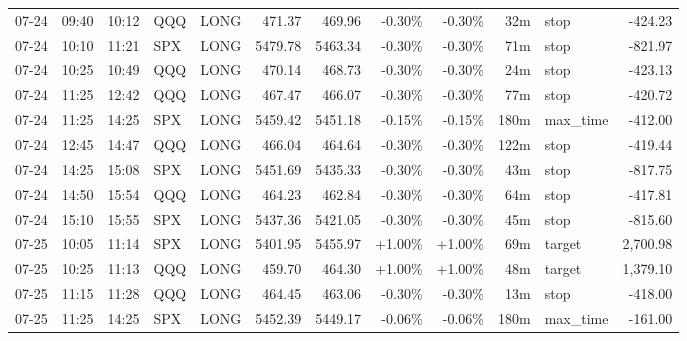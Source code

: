 \documentclass[11pt,a4paper,twoside]{article}
\begin{document}
\begin{center}
\begin{longtable}{>{\color{txtmain}}l l l l l r r r r r >{\color{txtmain}}l r}
07-24 & 09:40 & 10:12 & QQQ & LONG & 471.37 & 469.96 & \textcolor{lossred}{-0.30\%} & \textcolor{lossred}{-0.30\%} & 32m & stop & \textcolor{lossred}{-424.23} \\
07-24 & 10:10 & 11:21 & SPX & LONG & 5479.78 & 5463.34 & \textcolor{lossred}{-0.30\%} & \textcolor{lossred}{-0.30\%} & 71m & stop & \textcolor{lossred}{-821.97} \\
07-24 & 10:25 & 10:49 & QQQ & LONG & 470.14 & 468.73 & \textcolor{lossred}{-0.30\%} & \textcolor{lossred}{-0.30\%} & 24m & stop & \textcolor{lossred}{-423.13} \\
07-24 & 11:25 & 12:42 & QQQ & LONG & 467.47 & 466.07 & \textcolor{lossred}{-0.30\%} & \textcolor{lossred}{-0.30\%} & 77m & stop & \textcolor{lossred}{-420.72} \\
07-24 & 11:25 & 14:25 & SPX & LONG & 5459.42 & 5451.18 & \textcolor{lossred}{-0.15\%} & \textcolor{lossred}{-0.15\%} & 180m & max\_time & \textcolor{lossred}{-412.00} \\
07-24 & 12:45 & 14:47 & QQQ & LONG & 466.04 & 464.64 & \textcolor{lossred}{-0.30\%} & \textcolor{lossred}{-0.30\%} & 122m & stop & \textcolor{lossred}{-419.44} \\
07-24 & 14:25 & 15:08 & SPX & LONG & 5451.69 & 5435.33 & \textcolor{lossred}{-0.30\%} & \textcolor{lossred}{-0.30\%} & 43m & stop & \textcolor{lossred}{-817.75} \\
07-24 & 14:50 & 15:54 & QQQ & LONG & 464.23 & 462.84 & \textcolor{lossred}{-0.30\%} & \textcolor{lossred}{-0.30\%} & 64m & stop & \textcolor{lossred}{-417.81} \\
07-24 & 15:10 & 15:55 & SPX & LONG & 5437.36 & 5421.05 & \textcolor{lossred}{-0.30\%} & \textcolor{lossred}{-0.30\%} & 45m & stop & \textcolor{lossred}{-815.60} \\
07-25 & 10:05 & 11:14 & SPX & LONG & 5401.95 & 5455.97 & \textcolor{wingreen}{+1.00\%} & \textcolor{wingreen}{+1.00\%} & 69m & target & \textcolor{wingreen}{2,700.98} \\
07-25 & 10:25 & 11:13 & QQQ & LONG & 459.70 & 464.30 & \textcolor{wingreen}{+1.00\%} & \textcolor{wingreen}{+1.00\%} & 48m & target & \textcolor{wingreen}{1,379.10} \\
07-25 & 11:15 & 11:28 & QQQ & LONG & 464.45 & 463.06 & \textcolor{lossred}{-0.30\%} & \textcolor{lossred}{-0.30\%} & 13m & stop & \textcolor{lossred}{-418.00} \\
07-25 & 11:25 & 14:25 & SPX & LONG & 5452.39 & 5449.17 & \textcolor{lossred}{-0.06\%} & \textcolor{lossred}{-0.06\%} & 180m & max\_time & \textcolor{lossred}{-161.00} \\

\end{longtable}
\end{center}
\end{document}
